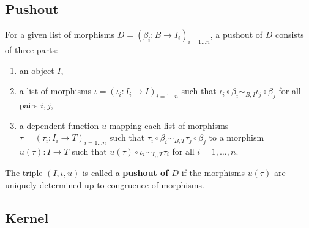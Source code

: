\subsection{Pushout}

\begin{definition}
 For a given list of morphisms $D = ( \beta_i: B \rightarrow I_i )_{i = 1 \dots n}$,
 a pushout of $D$ consists of three parts:
 \begin{enumerate}
  \item an object $I$,
  \item a list of morphisms $\iota = ( \iota_i: I_i \rightarrow I )_{i = 1 \dots n}$ such that
        $\iota_i \circ \beta_i \sim_{B,I} \iota_j \circ \beta_j$ for all pairs $i,j$,
  \item a dependent function $u$ mapping each list of morphisms
        $\tau = ( \tau_i: I_i \rightarrow T )_{i = 1 \dots n}$ such that
        $\tau_i \circ \beta_i \sim_{B,T} \tau_j \circ \beta_j$
        to a morphism $u( \tau ): I \rightarrow T$ such that
        $u( \tau ) \circ \iota_i \sim_{I_i, T} \tau_i$ for all $i = 1, \dots, n$.
 \end{enumerate}
  The triple $( I, \iota, u )$ is called a \textbf{pushout of $D$} if the morphisms $u( \tau )$ are uniquely determined up to
  congruence of morphisms.
\end{definition}

\subsection{Kernel}

